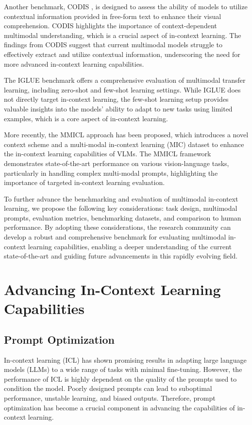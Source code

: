 \documentclass[11pt]{article}
\begin{document}
Another benchmark, CODIS \cite{ref61}, is designed to assess the ability of models to utilize contextual information provided in free-form text to enhance their visual comprehension. CODIS highlights the importance of context-dependent multimodal understanding, which is a crucial aspect of in-context learning. The findings from CODIS suggest that current multimodal models struggle to effectively extract and utilize contextual information, underscoring the need for more advanced in-context learning capabilities.

The IGLUE benchmark \cite{ref62} offers a comprehensive evaluation of multimodal transfer learning, including zero-shot and few-shot learning settings. While IGLUE does not directly target in-context learning, the few-shot learning setup provides valuable insights into the models' ability to adapt to new tasks using limited examples, which is a core aspect of in-context learning.

More recently, the MMICL \cite{ref58} approach has been proposed, which introduces a novel context scheme and a multi-modal in-context learning (MIC) dataset to enhance the in-context learning capabilities of VLMs. The MMICL framework demonstrates state-of-the-art performance on various vision-language tasks, particularly in handling complex multi-modal prompts, highlighting the importance of targeted in-context learning evaluation.

To further advance the benchmarking and evaluation of multimodal in-context learning, we propose the following key considerations: task design, multimodal prompts, evaluation metrics, benchmarking datasets, and comparison to human performance. By adopting these considerations, the research community can develop a robust and comprehensive benchmark for evaluating multimodal in-context learning capabilities, enabling a deeper understanding of the current state-of-the-art and guiding future advancements in this rapidly evolving field.

\section{Advancing In-Context Learning Capabilities}

\subsection{Prompt Optimization}

In-context learning (ICL) has shown promising results in adapting large language models (LLMs) to a wide range of tasks with minimal fine-tuning. However, the performance of ICL is highly dependent on the quality of the prompts used to condition the model. Poorly designed prompts can lead to suboptimal performance, unstable learning, and biased outputs. Therefore, prompt optimization has become a crucial component in advancing the capabilities of in-context learning.
\end{document}
